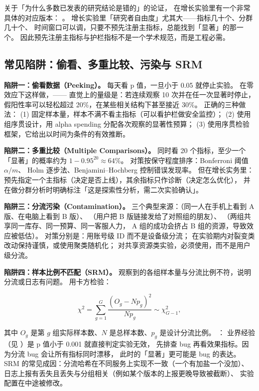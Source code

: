 \cite{ioannidis2005why} 关于「为什么多数已发表的研究结论是错的」的论证，
在增长实验里有一个非常具体的对应版本：
。
增长实验里「研究者自由度」尤其大——指标几十个、分群几十个、
时间窗口可以调，只要不预先注册主指标，总能找到「显著」的那一个。
因此预先注册主指标与护栏指标不是一个学术规范，而是工程必需。

\subsection{常见陷阱：偷看、多重比较、污染与 SRM}

\textbf{陷阱一：偷看数据（Peeking）。}
每天看 p 值，一旦小于 0.05 就停止实验。
在零效应下这样做，——
直觉上的量级是：若连续观察 10 次并在任一次显著时停止，
假阳性率可以轻松超过 20\%，在某些相关结构下甚至接近 30\%。
正确的三种做法：
(1) 固定样本量，样本不满不看主指标（可以看护栏做安全监控）；
(2) 使用组序贯设计，用 alpha spending 分配各次观察的显著性预算；
(3) 使用序贯检验框架，它给出以时间为条件的有效推断。

\textbf{陷阱二：多重比较（Multiple Comparisons）。}
同时看 20 个指标，至少一个「显著」的概率约为 $1 - 0.95^{20} \approx 64\%$。
对策按保守程度排序：Bonferroni 阈值 $\alpha/m$、
Holm 逐步法、Benjamini--Hochberg 控制错误发现率。
但在增长实务里：
预先指定一个主指标（决定是否上线），其余指标只作诊断（决定怎么优化），
并在做分群分析时明确标注「这是探索性分析，需二次实验确认」。

\textbf{陷阱三：分流污染（Contamination）。}
三个典型来源：（同一人在手机上看到 A 版、在电脑上看到 B 版）、
（用户把 B 版链接发给了对照组的朋友）、
（两组共享同一库存、同一预算、同一客服人力，
A 组的成功会挤占 B 组的资源，导致效应被低估）。
对策分别是：用账号级 ID 而不是设备级分流；
在实验期内对裂变类改动保持谨慎，或使用聚类随机化；
对共享资源类实验，必须使用，而不是用户级分流。

\textbf{陷阱四：样本比例不匹配（SRM）。}
观察到的各组样本量与分流比例不符，说明分流或日志有问题。
用卡方检验：

\begin{equation}
\chi^{2} = \sum_{g=1}^{G} \frac{(O_g - N p_g)^{2}}{N p_g} \sim \chi^{2}_{G-1},
\label{eq:growth-srm}
\end{equation}

其中 $O_g$ 是第 $g$ 组实际样本数、$N$ 是总样本数、$p_g$ 是设计分流比例。
：
业界经验（见 \cite{kohavi2020trustworthy}）是 p 值小于 0.001 就直接判定实验无效，
先排查 bug 再看效果指标。因为分流 bug 会让所有指标同时漂移，
此时的「显著」更可能是 bug 的表达。
SRM 的常见成因：分流哈希在不同服务上实现不一致（一个有加盐一个没加）、
日志上报有丢失且丢失与分组相关（例如某个版本的上报更晚导致被截断）、
实验配置在中途被修改。

